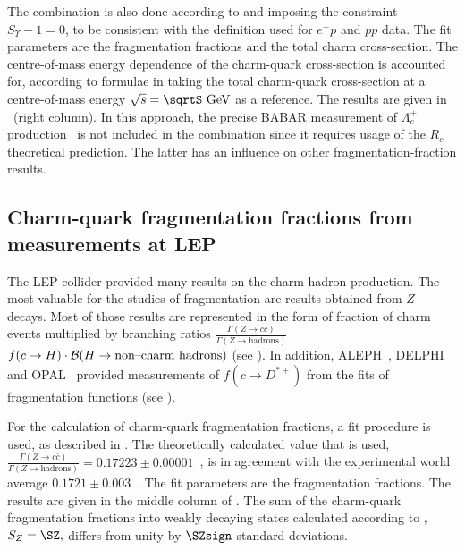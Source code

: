 The combination is also done according to  and  imposing 
the constraint $S_{\Upsilon}-1=0$, to be consistent with the definition 
used for $e^{\pm}p$ and $pp$ data. The fit parameters are the 
fragmentation fractions and the total charm cross-section. 
The centre-of-mass energy dependence of the charm-quark cross-section 
is accounted for, according to formulae in  taking the 
total charm-quark 
cross-section  at a centre-of-mass energy
 $\sqrt{s}=\sqrtS~\GeV$  as a reference.
 The results are given  in ~(right column).
In this approach, the precise BABAR measurement of $\Lambda_{c}^{+}$ 
production~\cite{Aubert:2006cp} is not included in the combination
 since it requires usage of the $R_c$ theoretical prediction.
The latter has an  influence on other fragmentation-fraction results.
\FloatBarrier
\subsection{Charm-quark fragmentation fractions from measurements at 
LEP}
\label{sec:ssZZERO}
The LEP collider provided many results on the  charm-hadron production. 
%
The most valuable for the studies of fragmentation are results obtained 
from $Z$ decays. 
%
Most of those results are represented in the form of fraction of charm 
events  multiplied by branching ratios
$\frac{\Gamma(Z\rightarrow c\bar{c})}
{\Gamma(Z\rightarrow \text{hadrons})}$
$f(c\rightarrow H)\cdot {\cal B}(H\rightarrow\text{non--charm~hadrons})$
(see ).
%
In addition,  ALEPH~\cite{Barate:1999bg}, DELPHI~\cite{Abreu:1999vx} and 
OPAL~\cite{Ackerstaff:1997ki} provided measurements of $f(c \rightarrow 
D^{*+})$ from 
\tabEEZmeas
the fits of fragmentation functions (see ).  
%

For the calculation of charm-quark fragmentation fractions, a fit 
procedure is used, as  described in . 
The theoretically 
calculated value that is used, $\frac{\Gamma(Z \rightarrow 
c\bar{c})}{\Gamma(Z \rightarrow \text{hadrons})}
=0.17223\pm0.00001$~\cite{Freitas:2014hra}, is in agreement with
the experimental world average 
$0.1721\pm0.003$~\cite{PDG2014}.
%
The fit parameters are the fragmentation fractions.
%
The results are given in the middle column of .
The sum of the charm-quark  fragmentation fractions into  weakly 
decaying 
states calculated according to , $S_{Z}=\SZ,$  
differs from unity by $\SZsign$ standard deviations.
\FloatBarrier
\tabEEZaverage
%

